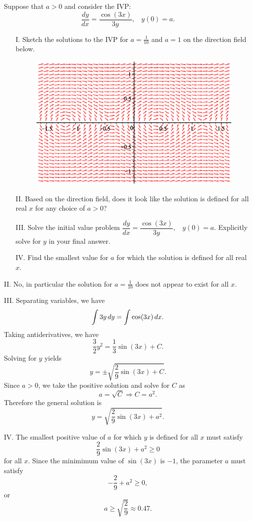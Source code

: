 \documentclass[]{ximera}
\begin{document}
\begin{problem} 

Suppose that $a>0$ and consider the IVP:  $$\dfrac{dy}{dx} = \dfrac{\cos(3x)}{3y}, ~ ~ ~ ~ y(0)=a.$$

\begin{itemize}
\item[I.] Sketch the solutions to the IVP for $a=\frac{1}{10}$ and $a=1$ on the direction field below.

 \begin{figure}[h!]
 \centering
  \includegraphics[width=.5 \textwidth]{IVP.eps}
\end{figure}

\item[II.] Based on the direction field, does it look like the solution is defined for all real $x$ for any choice of $a>0$?
\item[III.] Solve the initial value problem $\dfrac{dy}{dx} = \dfrac{\cos(3x)}{3y}, ~ ~ ~ ~ y(0)=a$.  Explicitly solve for $y$ in your final answer.
\item[IV.] Find the smallest value for $a$ for which the solution is defined for all real $x$.
\end{itemize}

\begin{solution}
II. No, in particular the solution for $a=\frac{1}{10}$ does not appear to exist for all $x$. 

III. Separating variables, we have
$$
\int 3y \mathop{}\!d y = \int \cos (3x) \mathop{}\!d x.
$$
Taking antiderivatives, we have
$$
\frac{3}{2}y^2 = \frac{1}{3} \sin(3x) + C.
$$
Solving for $y$ yields
$$
y = \pm \sqrt{\frac{2}{9} \sin(3x) + C}.
$$
Since $a > 0$, we take the positive solution and solve for $C$ as
$$
a = \sqrt{C} \Rightarrow C = a^2.
$$
Therefore the general solution is
$$
y = \sqrt{\frac{2}{9} \sin(3x) + a^2}.
$$

IV. The smallest positive value of $a$ for which $y$ is defined for all $x$ must satisfy
$$
\frac{2}{9} \sin(3x) + a^2 \geq 0
$$
for all $x$. Since the minimimum value of $\sin(3x)$ is $-1$, the parameter $a$ must satisfy
$$
-\frac{2}{9} + a^2 \geq 0,
$$
or 
$$
a \geq \sqrt{\frac{2}{9}} \approx 0.47.
$$
\end{solution}
\end{problem}
\end{document}
